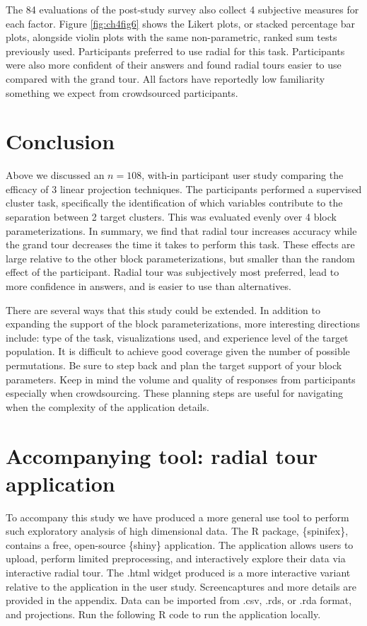 \documentclass{template/monashthesis}
\begin{document}
The 84 evaluations of the post-study survey also collect 4 subjective measures for each factor. Figure \ref{fig:ch4fig6} shows the Likert plots, or stacked percentage bar plots, alongside violin plots with the same non-parametric, ranked sum tests previously used. Participants preferred to use radial for this task. Participants were also more confident of their answers and found radial tours easier to use compared with the grand tour. All factors have reportedly low familiarity something we expect from crowdsourced participants.

\hypertarget{sec:conclusion}{%
\section{Conclusion}\label{sec:conclusion}}

Above we discussed an \(n=108\), with-in participant user study comparing the efficacy of 3 linear projection techniques. The participants performed a supervised cluster task, specifically the identification of which variables contribute to the separation between 2 target clusters. This was evaluated evenly over 4 block parameterizations. In summary, we find that radial tour increases accuracy while the grand tour decreases the time it takes to perform this task. These effects are large relative to the other block parameterizations, but smaller than the random effect of the participant. Radial tour was subjectively most preferred, lead to more confidence in answers, and is easier to use than alternatives.

There are several ways that this study could be extended. In addition to expanding the support of the block parameterizations, more interesting directions include: type of the task, visualizations used, and experience level of the target population. It is difficult to achieve good coverage given the number of possible permutations. Be sure to step back and plan the target support of your block parameters. Keep in mind the volume and quality of responses from participants especially when crowdsourcing. These planning steps are useful for navigating when the complexity of the application details.

\hypertarget{sec:spinifex}{%
\section{Accompanying tool: radial tour application}\label{sec:spinifex}}

To accompany this study we have produced a more general use tool to perform such exploratory analysis of high dimensional data. The R package, \{spinifex\}, \autocite{spyrison_spinifex_2020} contains a free, open-source \{shiny\} \autocite{chang_shiny_2020} application. The application allows users to upload, perform limited preprocessing, and interactively explore their data via interactive radial tour. The .html widget produced is a more interactive variant relative to the application in the user study. Screencaptures and more details are provided in the appendix. Data can be imported from .csv, .rds, or .rda format, and projections. Run the following R code to run the application locally.
\end{document}
